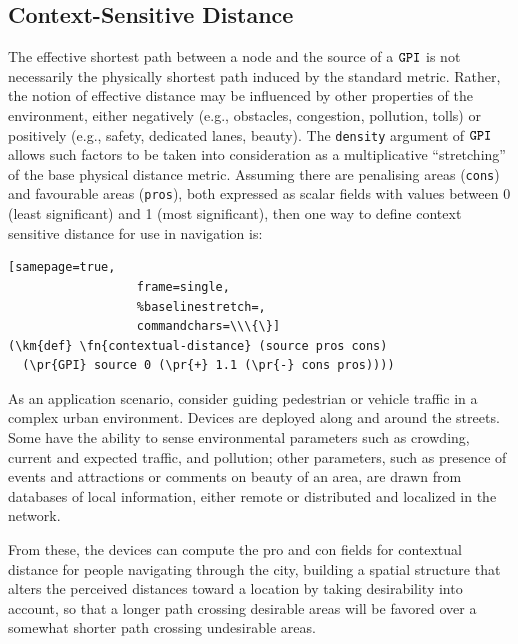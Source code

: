 \documentclass[12pt,a4paper,twoside,openright]{book}
\begin{document}
\subsection{Context-Sensitive Distance}

The effective shortest path between a node and the source of a $\texttt{GPI}$ is not necessarily the physically shortest path induced by the standard metric.
%
Rather, the notion of effective distance may be influenced by other properties of the environment, either negatively (e.g., obstacles, congestion, pollution, tolls) or positively (e.g., safety, dedicated lanes, beauty).
%
The {\tt density} argument of $\texttt{GPI}$ allows such factors to be taken into consideration as a multiplicative ``stretching'' of the base physical distance metric.
%
Assuming there are penalising areas (\texttt{cons}) and favourable areas (\texttt{pros}), both expressed as scalar fields with values between 0 (least significant) and 1 (most significant), then one way to define context sensitive distance for use in navigation is:
\begin{Verbatim}[samepage=true,
                  frame=single,
                  %baselinestretch=,
                  commandchars=\\\{\}]
(\km{def} \fn{contextual-distance} (source pros cons)
  (\pr{GPI} source 0 (\pr{+} 1.1 (\pr{-} cons pros))))
\end{Verbatim}


As an application scenario, consider guiding pedestrian or vehicle traffic in a complex urban environment.  Devices are deployed along and around the streets.
%
Some have the ability to sense environmental parameters such as crowding, current and expected traffic, and pollution; other parameters, such as presence of events and attractions or comments on
beauty of an area, are drawn from databases of local information, either remote or distributed and localized in the network.  

From these, the devices can compute the pro and con fields for contextual distance for people navigating through the city, building a spatial structure that alters the perceived distances toward a location by taking desirability into account, so that a longer path crossing desirable areas will be favored over a somewhat shorter path crossing undesirable areas.
\end{document}
